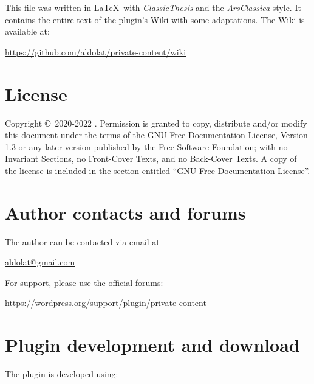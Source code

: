 \begingroup
	\footnotesize

	\noindent This file was written in \LaTeX~with \emph{ClassicThesis} and the
	\emph{ArsClassica} style. It contains the entire text of the plugin's Wiki
	with some adaptations. The Wiki is available at:

	\begin{center}
		\url{https://github.com/aldolat/private-content/wiki}
	\end{center}

	\vfill

	\section*{License}

	Copyright \copyright~2020-2022 \myName.\newline
    \noindent Permission is granted to copy, distribute and/or modify this
    document under the terms of the GNU Free Documentation License, Version 1.3
    or any later version published by the Free Software Foundation; with no
    Invariant Sections, no Front-Cover Texts, and no Back-Cover Texts. A copy of
    the license is included in the section entitled ``GNU Free Documentation
	License''.

	\section*{Author contacts and forums}

	\noindent The author can be contacted via email at
	\begin{center}
		\href{mailto:aldolat@gmail.com}{aldolat@gmail.com}
	\end{center}
	For support, please use the official forums:
	\begin{center}
	\url{https://wordpress.org/support/plugin/private-content}
	\end{center}
\endgroup

\newpage

\begingroup

	\footnotesize

	\section*{Plugin development and download}

	\noindent The plugin is developed using:

